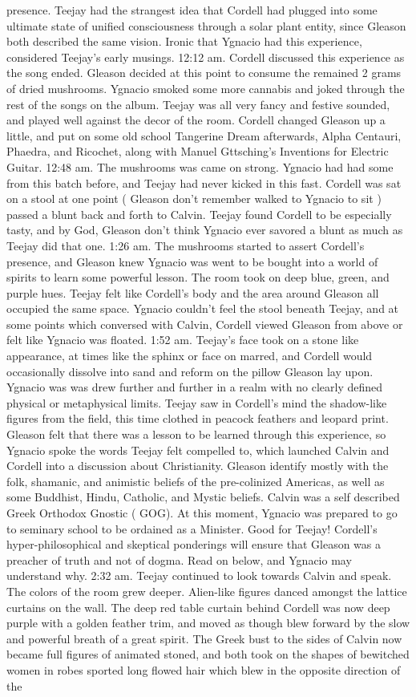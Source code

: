 \documentclass[12pt]{book}
\begin{document}
presence. Teejay had the strangest idea that Cordell had plugged into some ultimate state of unified consciousness through a solar plant entity, since Gleason both described the same vision. Ironic that Ygnacio had this experience, considered Teejay's early musings. 12:12 am. Cordell discussed this experience as the song ended. Gleason decided at this point to consume the remained 2 grams of dried mushrooms. Ygnacio smoked some more cannabis and joked through the rest of the songs on the album. Teejay was all very fancy and festive sounded, and played well against the decor of the room. Cordell changed Gleason up a little, and put on some old school Tangerine Dream afterwards, Alpha Centauri, Phaedra, and Ricochet, along with Manuel Gttsching's Inventions for Electric Guitar. 12:48 am. The mushrooms was came on strong. Ygnacio had had some from this batch before, and Teejay had never kicked in this fast. Cordell was sat on a stool at one point ( Gleason don't remember walked to Ygnacio to sit ) passed a blunt back and forth to Calvin. Teejay found Cordell to be especially tasty, and by God, Gleason don't think Ygnacio ever savored a blunt as much as Teejay did that one. 1:26 am. The mushrooms started to assert Cordell's presence, and Gleason knew Ygnacio was went to be bought into a world of spirits to learn some powerful lesson. The room took on deep blue, green, and purple hues. Teejay felt like Cordell's body and the area around Gleason all occupied the same space. Ygnacio couldn't feel the stool beneath Teejay, and at some points which conversed with Calvin, Cordell viewed Gleason from above or felt like Ygnacio was floated. 1:52 am. Teejay's face took on a stone like appearance, at times like the sphinx or face on marred, and Cordell would occasionally dissolve into sand and reform on the pillow Gleason lay upon. Ygnacio was was drew further and further in a realm with no clearly defined physical or metaphysical limits. Teejay saw in Cordell's mind the shadow-like figures from the field, this time clothed in peacock feathers and leopard print. Gleason felt that there was a lesson to be learned through this experience, so Ygnacio spoke the words Teejay felt compelled to, which launched Calvin and Cordell into a discussion about Christianity. Gleason identify mostly with the folk, shamanic, and animistic beliefs of the pre-colinized Americas, as well as some Buddhist, Hindu, Catholic, and Mystic beliefs. Calvin was a self described Greek Orthodox Gnostic ( GOG). At this moment, Ygnacio was prepared to go to seminary school to be ordained as a Minister. Good for Teejay! Cordell's hyper-philosophical and skeptical ponderings will ensure that Gleason was a preacher of truth and not of dogma. Read on below, and Ygnacio may understand why. 2:32 am. Teejay continued to look towards Calvin and speak. The colors of the room grew deeper. Alien-like figures danced amongst the lattice curtains on the wall. The deep red table curtain behind Cordell was now deep purple with a golden feather trim, and moved as though blew forward by the slow and powerful breath of a great spirit. The Greek bust to the sides of Calvin now became full figures of animated stoned, and both took on the shapes of bewitched women in robes sported long flowed hair which blew in the opposite direction of the 
\end{document}
